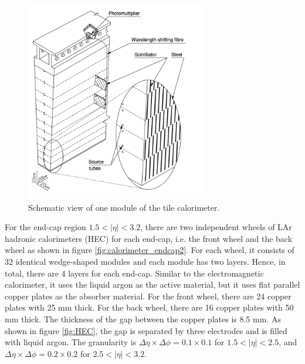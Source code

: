\begin{figure}
\centering
\includegraphics[width=0.7\textwidth]{data/photo/detector/tile.png}
\caption{Schematic view of one module of the tile calorimeter. \cite{ATLAS_doc}}
\label{fig:tile_calorimeter}
\end{figure}

For the end-cap region $1.5 < |\eta| < 3.2$, there are two independent wheels of LAr hadronic calorimeters (HEC) for each end-cap, i.e. the front wheel and the back wheel as shown in figure \ref{fig:calorimeter_endcap2}.
For each wheel, it consists of 32 identical wedge-shaped modules and each module has two layers.
Hence, in total, there are 4 layers for each end-cap.
Similar to the electromagnetic calorimeter, it uses the liquid argon as the active material, but it uses flat parallel copper plates as the absorber material.
For the front wheel, there are 24 copper plates with 25 mm thick.
For the back wheel, there are 16 copper plates with 50 mm thick.
The thickness of the gap between the copper plates is 8.5 mm.
As shown in figure \ref{fig:HEC}, the gap is separated by three electrodes and is filled with liquid argon.
The granularity is $\Delta \eta \times \Delta \phi = 0.1 \times 0.1$ for $1.5 < |\eta| < 2.5$, and $\Delta \eta \times \Delta \phi = 0.2 \times 0.2$ for $2.5 < |\eta| < 3.2$.

